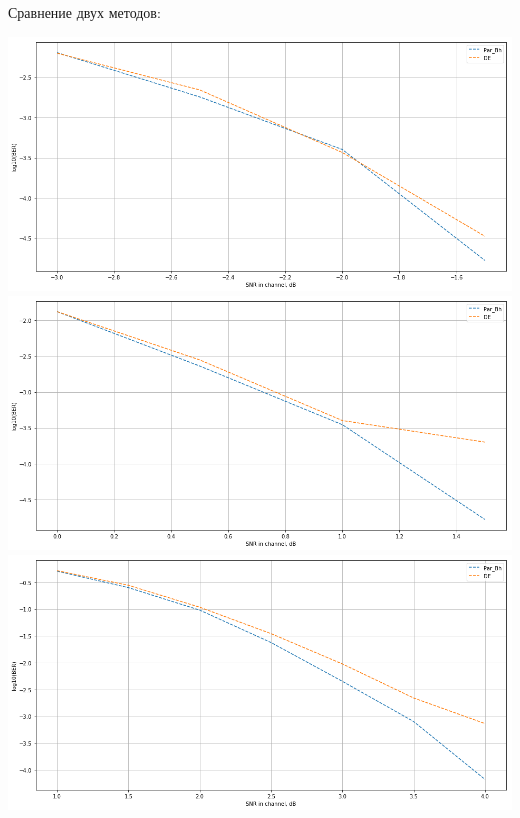 \documentclass[a1paper,portrait,fontscale=0.554]{baposter}
\begin{document}
\begin{poster}
{Сравнение двух методов:
\begin{center}
\includegraphics[width=0.49\linewidth]{com_0_25}
\includegraphics[width=0.49\linewidth]{com_0_5}
\includegraphics[width=0.449\linewidth]{com_0_75}
\end{center}

}
\end{poster}
\end{document}
